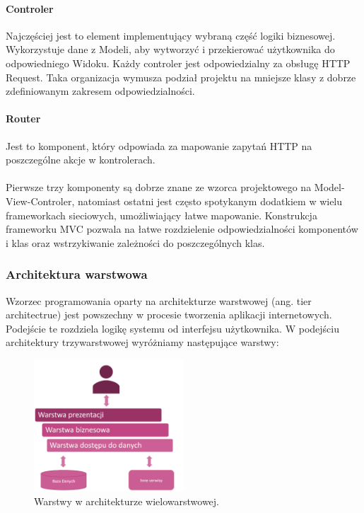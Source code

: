 \documentclass{article}
\begin{document}
\paragraph{Controler}
Najczęściej jest to element implementujący wybraną część logiki biznesowej. Wykorzystuje dane z Modeli, aby wytworzyć i przekierować użytkownika do odpowiedniego Widoku. Każdy controler jest odpowiedzialny za obsługę HTTP Request. Taka organizacja wymusza podział projektu na mniejsze klasy z dobrze zdefiniowanym zakresem odpowiedzialności.

\paragraph{Router}
Jest to komponent, który odpowiada za mapowanie zapytań HTTP na poszczególne akcje w kontrolerach.
\\\\
Pierwsze trzy komponenty są dobrze znane ze wzorca projektowego na Model-View-Controler, natomiast ostatni jest często spotykanym dodatkiem w wielu frameworkach sieciowych, umożliwiający łatwe mapowanie. Konstrukcja frameworku MVC pozwala na łatwe rozdzielenie odpowiedzialności komponentów i klas oraz wstrzykiwanie zależności do poszczególnych klas.

\subsubsection{Architektura warstwowa}


Wzorzec programowania oparty na architekturze warstwowej (ang. tier architectrue) jest powszechny w procesie tworzenia aplikacji internetowych. Podejście te rozdziela logikę systemu od interfejsu użytkownika. W podejściu architektury trzywarstwowej wyróżniamy następujące warstwy:

\begin{figure}[h]
\centering
	\includegraphics[width=0.50\textwidth]{ntier.png}
	\caption[caption]{Warstwy w architekturze wielowarstwowej.}
	\label{fig:tier}
\end{figure}
\end{document}
